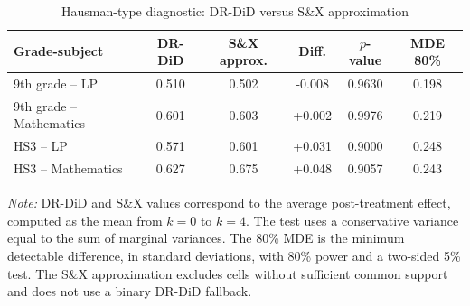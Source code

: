 ﻿\begin{table}[htbp]
\centering
\caption{Hausman-type diagnostic: DR-DiD versus S\&X approximation}
\label{tab:hausman_composicao}
\small
\begin{threeparttable}
\begin{tabular}{lccccc}
\toprule
Grade-subject & DR-DiD & S\&X approx. & Diff. & \(p\)-value & MDE 80\% \\
\midrule
9th grade -- LP & 0.510 & 0.502 & -0.008 & 0.9630 & 0.198 \\
9th grade -- Mathematics & 0.601 & 0.603 & +0.002 & 0.9976 & 0.219 \\
HS3 -- LP & 0.571 & 0.601 & +0.031 & 0.9000 & 0.248 \\
HS3 -- Mathematics & 0.627 & 0.675 & +0.048 & 0.9057 & 0.243 \\
\bottomrule
\end{tabular}
\begin{tablenotes}
\footnotesize
\item \textit{Note:} DR-DiD and S\&X values correspond to the average post-treatment effect, computed as the mean from \(k=0\) to \(k=4\). The test uses a conservative variance equal to the sum of marginal variances. The 80\% MDE is the minimum detectable difference, in standard deviations, with 80\% power and a two-sided 5\% test. The S\&X approximation excludes cells without sufficient common support and does not use a binary DR-DiD fallback.
\end{tablenotes}
\end{threeparttable}
\end{table}



